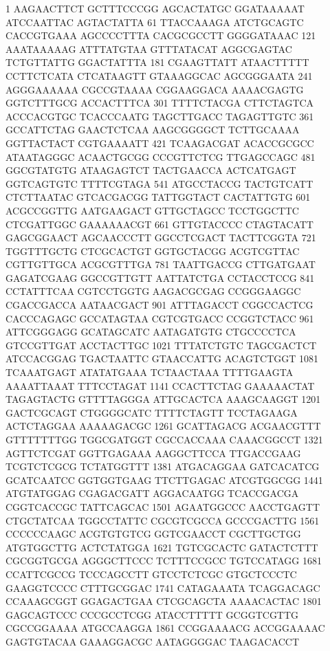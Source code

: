\begin{addmargin}{0.1\textwidth}

  \begin{footnotesize}
\begin{LVerbatim}[commandchars=\\\{\}]

   1 AAGAACTTCT GCTTTCCCGG AGCACTATGC GGATAAAAAT ATCCAATTAC AGTACTATTA 
  61 TTACCAAAGA ATCTGCAGTC CACCGTGAAA AGCCCCTTTA CACGCGCCTT GGGGATAAAC 
 121 AAATAAAAAG ATTTATGTAA GTTTATACAT AGGCGAGTAC TCTGTTATTG GGACTATTTA 
 181 CGAAGTTATT ATAACTTTTT CCTTCTCATA CTCATAAGTT GTAAAGGCAC AGCGGGAATA 
 241 AGGGAAAAAA CGCCGTAAAA CGGAAGGACA AAAACGAGTG GGTCTTTGCG ACCACTTTCA 
 301 TTTTCTACGA CTTCTAGTCA ACCCACGTGC TCACCCAATG TAGCTTGACC TAGAGTTGTC 
 361 GCCATTCTAG GAACTCTCAA AAGCGGGGCT TCTTGCAAAA GGTTACTACT CGTGAAAATT 
 421 TCAAGACGAT ACACCGCGCC ATAATAGGGC ACAACTGCGG CCCGTTCTCG TTGAGCCAGC 
 481 GGCGTATGTG ATAAGAGTCT TACTGAACCA ACTCATGAGT GGTCAGTGTC TTTTCGTAGA 
 541 ATGCCTACCG TACTGTCATT CTCTTAATAC GTCACGACGG TATTGGTACT CACTATTGTG 
 601 ACGCCGGTTG AATGAAGACT GTTGCTAGCC TCCTGGCTTC CTCGATTGGC GAAAAAACGT 
 661 GTTGTACCCC CTAGTACATT GAGCGGAACT AGCAACCCTT GGCCTCGACT TACTTCGGTA 
 721 TGGTTTGCTG CTCGCACTGT GGTGCTACGG ACGTCGTTAC CGTTGTTGCA ACGCGTTTGA 
 781 TAATTGACCG CTTGATGAAT GAGATCGAAG GGCCGTTGTT AATTATCTGA CCTACCTCCG 
 841 CCTATTTCAA CGTCCTGGTG AAGACGCGAG CCGGGAAGGC CGACCGACCA AATAACGACT 
 901 ATTTAGACCT CGGCCACTCG CACCCAGAGC GCCATAGTAA CGTCGTGACC CCGGTCTACC 
 961 ATTCGGGAGG GCATAGCATC AATAGATGTG CTGCCCCTCA GTCCGTTGAT ACCTACTTGC 
1021 TTTATCTGTC TAGCGACTCT ATCCACGGAG TGACTAATTC GTAACCATTG ACAGTCTGGT 
1081 TCAAATGAGT ATATATGAAA TCTAACTAAA TTTTGAAGTA AAAATTAAAT TTTCCTAGAT 
1141 CCACTTCTAG GAAAAACTAT TAGAGTACTG GTTTTAGGGA ATTGCACTCA AAAGCAAGGT 
1201 GACTCGCAGT CTGGGGCATC TTTTCTAGTT TCCTAGAAGA ACTCTAGGAA AAAAAGACGC 
1261 GCATTAGACG ACGAACGTTT GTTTTTTTGG TGGCGATGGT CGCCACCAAA CAAACGGCCT 
1321 AGTTCTCGAT GGTTGAGAAA AAGGCTTCCA TTGACCGAAG TCGTCTCGCG TCTATGGTTT 
1381 ATGACAGGAA GATCACATCG GCATCAATCC GGTGGTGAAG TTCTTGAGAC ATCGTGGCGG 
1441 ATGTATGGAG CGAGACGATT AGGACAATGG TCACCGACGA CGGTCACCGC TATTCAGCAC 
1501 AGAATGGCCC AACCTGAGTT CTGCTATCAA TGGCCTATTC CGCGTCGCCA GCCCGACTTG 
1561 CCCCCCAAGC ACGTGTGTCG GGTCGAACCT CGCTTGCTGG ATGTGGCTTG ACTCTATGGA 
1621 TGTCGCACTC GATACTCTTT CGCGGTGCGA AGGGCTTCCC TCTTTCCGCC TGTCCATAGG 
1681 CCATTCGCCG TCCCAGCCTT GTCCTCTCGC GTGCTCCCTC GAAGGTCCCC CTTTGCGGAC 
1741 CATAGAAATA TCAGGACAGC CCAAAGCGGT GGAGACTGAA CTCGCAGCTA AAAACACTAC 
1801 GAGCAGTCCC CCCGCCTCGG ATACCTTTTT GCGGTCGTTG CGCCGGAAAA ATGCCAAGGA 
1861 CCGGAAAACG ACCGGAAAAC GAGTGTACAA GAAAGGACGC AATAGGGGAC TAAGACACCT 

\end{LVerbatim}
\end{footnotesize}
\end{addmargin}
